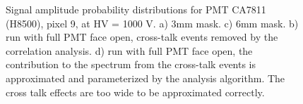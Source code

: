 \begin{figure}[hbt] 
\centering 
  \caption{Signal amplitude probability distributions for PMT CA7811 (H8500), pixel 9, at HV = 1000 V. a) 3mm mask. c) 6mm mask. b) run with full PMT face open, cross-talk events removed by the correlation analysis. d) run with full PMT face open, the contribution to the spectrum from the cross-talk events is approximated and parameterized by the analysis algorithm. The cross talk effects are too wide to be approximated correctly.
    }
\label{fig:CA7811}
\end{figure}

